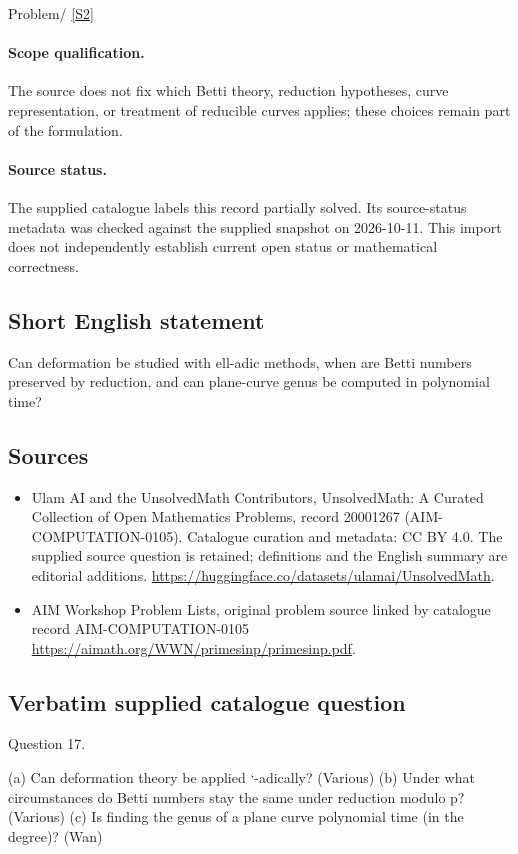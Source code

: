\documentclass[11pt]{article}
\begin{document}
Problem/ \href{https://aimath.org/WWN/primesinp/primesinp.pdf}{[S2]}
\paragraph{Scope qualification.}
The source does not fix which Betti theory, reduction hypotheses, curve representation, or treatment of reducible curves applies; these choices remain part of the formulation.
\paragraph{Source status.}
The supplied catalogue labels this record partially solved. Its source-status metadata was checked against the supplied snapshot on 2026-10-11. This import does not independently establish current open status or mathematical correctness.
\subsection{Short English statement}
Can deformation be studied with ell-adic methods, when are Betti numbers preserved by reduction, and can plane-curve genus be computed in polynomial time?
\subsection{Sources}
\begin{itemize}
\item[S1] Ulam AI and the UnsolvedMath Contributors, UnsolvedMath: A Curated Collection of Open Mathematics Problems, record 20001267 (AIM-COMPUTATION-0105). Catalogue curation and metadata: CC BY 4.0. The supplied source question is retained; definitions and the English summary are editorial additions.
\url{https://huggingface.co/datasets/ulamai/UnsolvedMath}.
\item[S2] AIM Workshop Problem Lists, original problem source linked by catalogue record AIM-COMPUTATION-0105
\url{https://aimath.org/WWN/primesinp/primesinp.pdf}.
\end{itemize}
\subsection{Verbatim supplied catalogue question}
Question 17.

(a) Can deformation theory be applied `-adically? (Various) (b) Under what circumstances do Betti numbers stay the same under reduction modulo p?(Various) (c) Is finding the genus of a plane curve polynomial time (in the degree)? (Wan)
\end{document}

